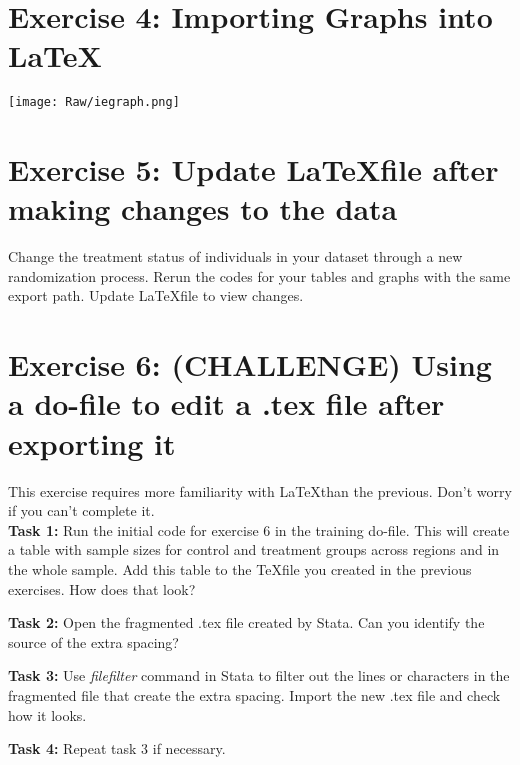 \documentclass[12pts]{report}
\begin{document}
\section*{Exercise 4: Importing Graphs into \LaTeX}

\texttt{[image: Raw/iegraph.png]}

\section*{Exercise 5: Update \LaTeX\space file after making changes to the data}
Change the treatment status of individuals in your dataset through a new randomization process. Rerun the codes for your tables and graphs with the same export path. Update \LaTeX file to view changes.

\section*{Exercise 6: (CHALLENGE) Using a do-file to edit a .tex file after exporting it}

This exercise requires more familiarity with \LaTeX \space than the previous. Don't worry if you can't complete it. \\

\textbf{Task 1:} Run the initial code for exercise 6 in the training do-file. This will create a table with sample sizes for control and treatment groups across regions and in the whole sample. Add this table to the \TeX\space file you created in the previous exercises. How does that look?

\textbf{Task 2:} Open the fragmented .tex file created by Stata. Can you identify the source of the extra spacing?

\textbf{Task 3:} Use \textit{filefilter} command in Stata to filter out the lines or characters in the fragmented file that create the extra spacing. Import the new .tex file and check how it looks.

\textbf{Task 4:} Repeat task 3 if necessary.
\end{document}
